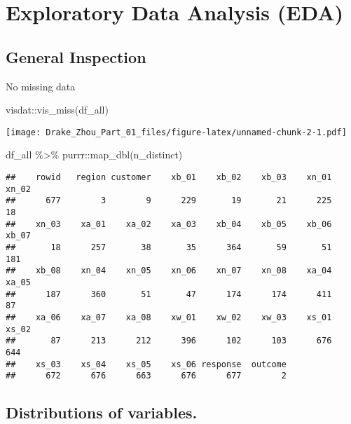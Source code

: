 \documentclass[
]{article}
\newenvironment{Shaded}{\begin{snugshade}}{\end{snugshade}}
\newcommand{\FunctionTok}[1]{\textcolor[rgb]{0.00,0.00,0.00}{#1}}
\newcommand{\NormalTok}[1]{#1}
\newcommand{\SpecialCharTok}[1]{\textcolor[rgb]{0.00,0.00,0.00}{#1}}
\begin{document}
\hypertarget{exploratory-data-analysis-eda}{%
\section{Exploratory Data Analysis
(EDA)}\label{exploratory-data-analysis-eda}}

\hypertarget{general-inspection}{%
\subsection{General Inspection}\label{general-inspection}}

No missing data

\begin{Shaded}
\begin{Highlighting}[]
\NormalTok{visdat}\SpecialCharTok{::}\FunctionTok{vis\_miss}\NormalTok{(df\_all)}
\end{Highlighting}
\end{Shaded}

\texttt{[image: Drake\_Zhou\_Part\_01\_files/figure-latex/unnamed-chunk-2-1.pdf]}

\begin{Shaded}
\begin{Highlighting}[]
\NormalTok{df\_all }\SpecialCharTok{\%\textgreater{}\%}\NormalTok{ purrr}\SpecialCharTok{::}\FunctionTok{map\_dbl}\NormalTok{(n\_distinct)}
\end{Highlighting}
\end{Shaded}

\begin{verbatim}
##    rowid   region customer    xb_01    xb_02    xb_03    xn_01    xn_02 
##      677        3        9      229       19       21      225       18 
##    xn_03    xa_01    xa_02    xa_03    xb_04    xb_05    xb_06    xb_07 
##       18      257       38       35      364       59       51      181 
##    xb_08    xn_04    xn_05    xn_06    xn_07    xn_08    xa_04    xa_05 
##      187      360       51       47      174      174      411       87 
##    xa_06    xa_07    xa_08    xw_01    xw_02    xw_03    xs_01    xs_02 
##       87      213      212      396      102      103      676      644 
##    xs_03    xs_04    xs_05    xs_06 response  outcome 
##      672      676      663      676      677        2
\end{verbatim}

\hypertarget{distributions-of-variables.}{%
\subsection{Distributions of
variables.}\label{distributions-of-variables.}}
\end{document}
